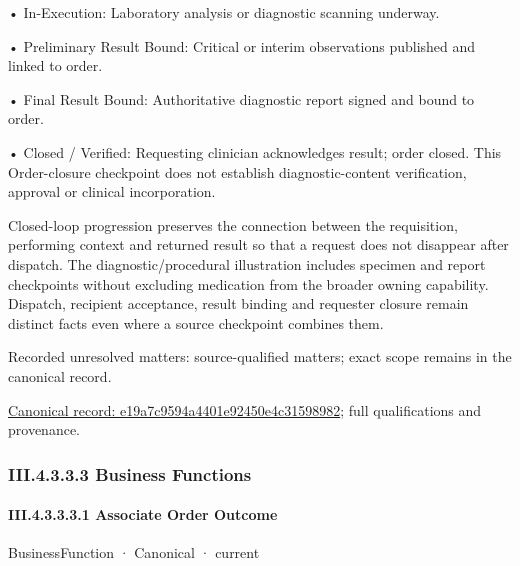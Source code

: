 •
In-Execution: Laboratory analysis or diagnostic scanning underway.



•
Preliminary Result Bound: Critical or interim observations published and linked to order.



•
Final Result Bound: Authoritative diagnostic report signed and bound to order.



•
Closed / Verified: Requesting clinician acknowledges result; order closed. This Order-closure checkpoint does not establish diagnostic-content verification, approval or clinical incorporation.



Closed-loop progression preserves the connection between the requisition, performing context and returned result so that a request does not disappear after dispatch. The diagnostic/procedural illustration includes specimen and report checkpoints without excluding medication from the broader owning capability. Dispatch, recipient acceptance, result binding and requester closure remain distinct facts even where a source checkpoint combines them.


{\small Recorded unresolved matters: source-qualified matters; exact scope remains in the canonical record.}\par
{\footnotesize \href{../../../../continuum/business/business-process/e19a7c9594a4401e92450e4c31598982.md}{Canonical record: e19a7c9594a4401e92450e4c31598982}; full qualifications and provenance.}\par
\subsubsection*{III.4.3.3.3 Business Functions}
\label{navigation:III.4.3.3.3}

\paragraph*{III.4.3.3.3.1 Associate Order Outcome}
\label{navigation:III.4.3.3.3.1}

\label{element:8bc2b528ca354c8ba95ddb44facdcd05}
{\small BusinessFunction · Canonical · current}\par

